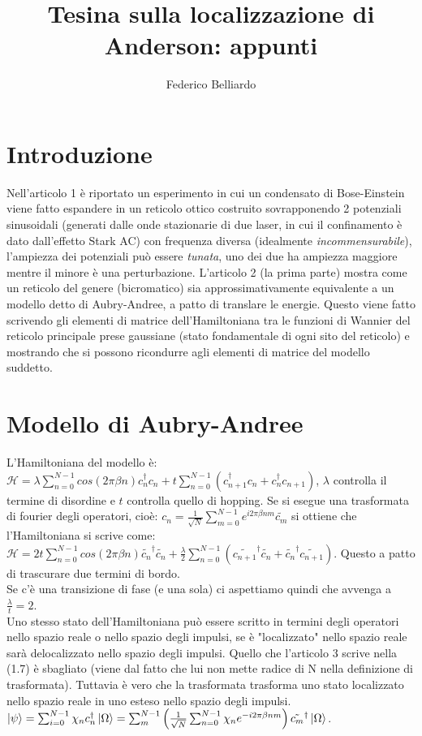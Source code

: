 \documentclass[10pt,a4paper]{article}
\author{Federico Belliardo}
\title{Tesina sulla localizzazione di Anderson: appunti}
\begin{document}
\maketitle

\section{Introduzione}
Nell'articolo 1 è riportato un esperimento in cui un condensato di Bose-Einstein viene fatto espandere in un reticolo ottico costruito sovrapponendo 2 potenziali sinusoidali (generati dalle onde stazionarie di due laser, in cui il confinamento è dato dall'effetto Stark AC) con frequenza diversa (idealmente \emph{incommensurabile}), l'ampiezza dei potenziali può essere \emph{tunata}, uno dei due ha ampiezza maggiore mentre il minore è una perturbazione.
L'articolo 2 (la prima parte) mostra come un reticolo del genere (bicromatico) sia approssimativamente equivalente a un modello detto di Aubry-Andree, a patto di translare le energie. Questo viene fatto scrivendo gli elementi di matrice dell'Hamiltoniana tra le funzioni di Wannier del reticolo principale prese gaussiane (stato fondamentale di ogni sito del reticolo) e mostrando che si possono ricondurre agli elementi di matrice del modello suddetto.\\
\section{Modello di Aubry-Andree}
L'Hamiltoniana del modello è: $\mathcal{H} = \lambda \sum_{n=0}^{N-1} cos(2 \pi \beta n) c_n ^{\dagger} c_n + t \sum_{n=0}^{N-1} (c_{n+1}^{\dagger} c_n + c_n ^{\dagger} c_{n+1})$, $\lambda$ controlla il termine di disordine e $t$ controlla quello di hopping.
Se si esegue una trasformata di fourier degli operatori, cioè: $c_n = \frac{1}{\sqrt{N}} \sum_{m=0}^{N-1} e^{i 2 \pi \beta n m} \tilde{c_m}$ si ottiene che l'Hamiltoniana si scrive come: $\mathcal{H} = 2 t \sum_{n=0}^{N-1} cos(2 \pi \beta n) \tilde{c_n}^{\dagger} \tilde{c_n} + \frac{\lambda}{2} \sum_{n=0}^{N-1} (\tilde{c_{n+1}}^{\dagger} \tilde{c_n} + \tilde{c_n}^{\dagger} \tilde{c_{n+1}})$. Questo a patto di trascurare due termini di bordo.\\
Se c'è una transizione di fase (e una sola) ci aspettiamo quindi che avvenga a $\frac{\lambda}{t} = 2$.\\
Uno stesso stato dell'Hamiltoniana può essere scritto in termini degli operatori nello spazio reale o nello spazio degli impulsi, se è "localizzato" nello spazio reale sarà delocalizzato nello spazio degli impulsi. Quello che l'articolo 3 scrive nella (1.7) è sbagliato (viene dal fatto che lui non mette radice di N nella definizione di trasformata). Tuttavia è vero che la trasformata trasforma uno stato localizzato nello spazio reale in uno esteso nello spazio degli impulsi.
$\ket{\psi} = \sum_{i=0}^{N-1} \chi_n c_n^{\dagger} \ket{\Omega} = \sum_m^{N-1} \left( \frac{1}{\sqrt{N}} \sum_{n=0}^{N-1} \chi_n e^{-i 2 \pi \beta n m} \right)\tilde{c_m}^{\dagger} \ket{\Omega}$.
\end{document}
